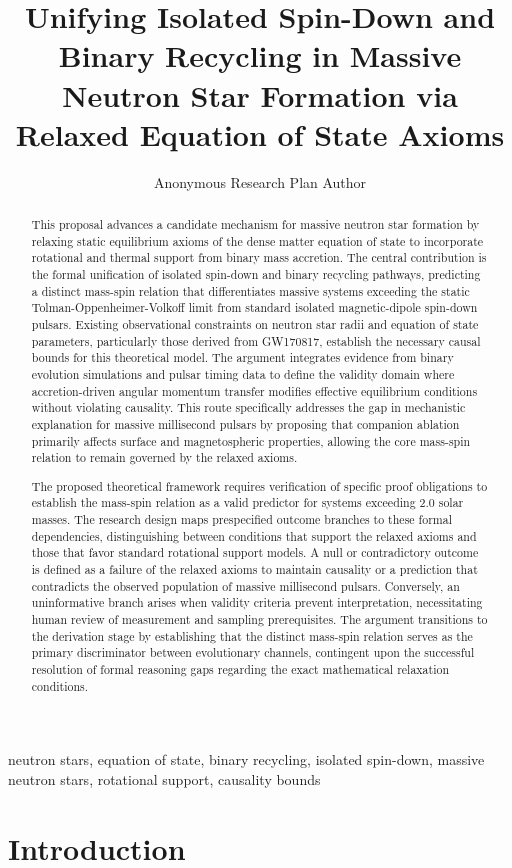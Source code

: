 \documentclass[conference]{IEEEtran}
\begin{document}
\title{Unifying Isolated Spin-Down and Binary Recycling in Massive Neutron Star Formation via Relaxed Equation of State Axioms}\author{Anonymous Research Plan Author}\maketitle

\begin{abstract}
This proposal advances a candidate mechanism for massive neutron star formation by relaxing static equilibrium axioms of the dense matter equation of state to incorporate rotational and thermal support from binary mass accretion. The central contribution is the formal unification of isolated spin-down and binary recycling pathways, predicting a distinct mass-spin relation that differentiates massive systems exceeding the static Tolman-Oppenheimer-Volkoff limit from standard isolated magnetic-dipole spin-down pulsars. Existing observational constraints on neutron star radii and equation of state parameters, particularly those derived from GW170817, establish the necessary causal bounds for this theoretical model. The argument integrates evidence from binary evolution simulations and pulsar timing data to define the validity domain where accretion-driven angular momentum transfer modifies effective equilibrium conditions without violating causality. This route specifically addresses the gap in mechanistic explanation for massive millisecond pulsars by proposing that companion ablation primarily affects surface and magnetospheric properties, allowing the core mass-spin relation to remain governed by the relaxed axioms.

The proposed theoretical framework requires verification of specific proof obligations to establish the mass-spin relation as a valid predictor for systems exceeding 2.0 solar masses. The research design maps prespecified outcome branches to these formal dependencies, distinguishing between conditions that support the relaxed axioms and those that favor standard rotational support models. A null or contradictory outcome is defined as a failure of the relaxed axioms to maintain causality or a prediction that contradicts the observed population of massive millisecond pulsars. Conversely, an uninformative branch arises when validity criteria prevent interpretation, necessitating human review of measurement and sampling prerequisites. The argument transitions to the derivation stage by establishing that the distinct mass-spin relation serves as the primary discriminator between evolutionary channels, contingent upon the successful resolution of formal reasoning gaps regarding the exact mathematical relaxation conditions.
\end{abstract}
\begin{IEEEkeywords}
neutron stars, equation of state, binary recycling, isolated spin-down, massive neutron stars, rotational support, causality bounds
\end{IEEEkeywords}\section{Introduction}
\end{document}
